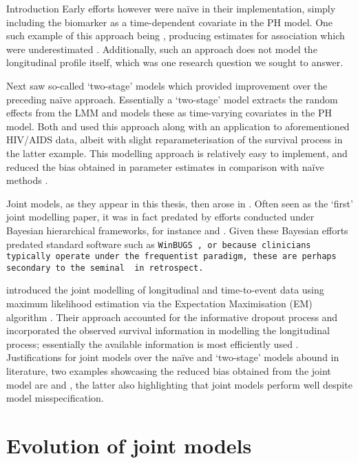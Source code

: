 \begin{chapter}{\label{cha:intro}Introduction}
  Early efforts however were na\"{i}ve in their implementation, simply including the biomarker as a time-dependent covariate in the PH model. One such example of this approach being \citet{Andersen1982}, producing estimates for association which were underestimated \citep{Prentice1982, Sweeting2011}. Additionally, such an approach does not model the longitudinal profile itself, which was one research question we sought to answer.

  Next saw so-called `two-stage' models which provided improvement over the preceding na\"{i}ve approach. Essentially a `two-stage' model extracts the random effects from the LMM and models these as time-varying covariates in the PH model. Both \citet{Tsiatis1995} and \citet{DeGruttola1994} used this approach along with an application to aforementioned HIV/AIDS data, albeit with slight reparameterisation of the survival process in the latter example. This modelling approach is relatively easy to implement, and reduced the bias obtained in parameter estimates in comparison with na\"{i}ve methods \citep{Dafni1998}.

  Joint models, as they appear in this thesis, then arose in \citet{Wulfsohn97}. Often seen as the  `first' joint modelling paper, it was in fact predated by efforts conducted under Bayesian hierarchical frameworks, for instance \citet{Berzuini1996} and \citet{Faucett1996}. Given these Bayesian efforts predated standard software such as \tt{WinBUGS} \citep{Winbugs-manual}, or because clinicians typically operate under the frequentist paradigm, these are perhaps secondary to the seminal \citet{Wulfsohn97} in retrospect.

  \citet{Wulfsohn97} introduced the joint modelling of longitudinal and time-to-event data using maximum likelihood estimation via the Expectation Maximisation (EM) algorithm \citep{Dempster77}. Their approach accounted for the informative dropout process and incorporated the observed survival information in modelling the longitudinal process; essentially the available information is most efficiently used \citep{JMOverview}. Justifications for joint models over the na\"{i}ve and `two-stage' models abound in literature, two examples showcasing the reduced bias obtained from the joint model are \citet{Ibrahim2010} and \citet{Sweeting2011}, the latter also highlighting that joint models perform well despite model misspecification.

  \section{Evolution of joint models}\label{sec:intro-evolution-parent}

\end{chapter}
